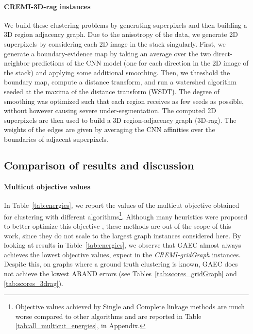 \paragraph{CREMI-3D-rag instances} 
We build these clustering problems by generating superpixels and then building a 3D region adjacency graph.
Due to the anisotropy of the data, we generate 2D superpixels by considering each 2D image in the stack singularly.
First, we generate a boundary-evidence map by taking an average over the two direct-neighbor predictions of the CNN model (one for each direction in the 2D image of the stack) and applying some additional smoothing. Then, we threshold the boundary map, compute a distance transform, and run a watershed algorithm seeded at the maxima of the distance transform (WSDT). The degree of smoothing was optimized such that each region receives as few seeds as possible, without however causing severe under-segmentation. 
The computed 2D superpixels are then used to build a 3D region-adjacency graph (3D-rag). The weights of the edges are given by averaging the CNN affinities over the boundaries of adjacent superpixels. 








\subsection{Comparison of results and discussion}\label{sec:experiments_discussion}

\paragraph{Multicut objective values} In Table~\ref{tab:energies}, we report the values of the multicut objective obtained for clustering with different \algname{} algorithms\footnote{Objective values achieved by Single and Complete linkage methods are much worse compared to other algorithms and are reported in Table \ref{tab:all_multicut_energies}, in Appendix.}. Although many heuristics were proposed to better optimize this objective \cite{beier2016efficient,beier2014cut,kernighan1970efficient}, these methods are out of the scope of this work, since they do not scale to the largest graph instances considered here. By looking at results in Table~\ref{tab:energies}, we observe that GAEC almost always achieves the lowest objective values, expect in the \emph{CREMI-gridGraph} instances. Despite this, on graphs where a ground truth clustering is known, GAEC does not achieve the lowest ARAND errors (see Tables~\ref{tab:scores_gridGraph} and \ref{tab:scores_3drag}). 

